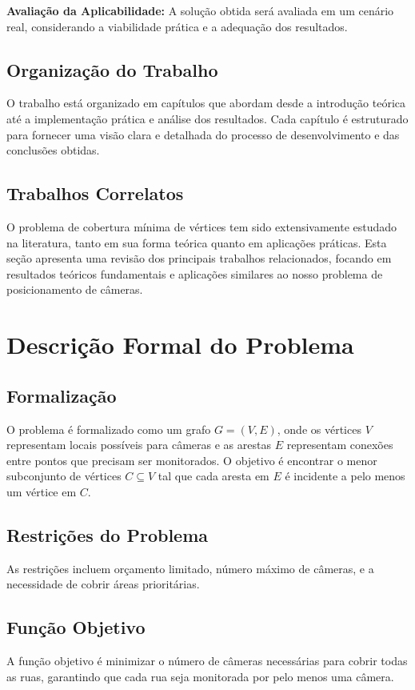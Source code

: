\documentclass[12pt, a4paper]{report}
\begin{document}
\textbf{Avaliação da Aplicabilidade:} A solução obtida será avaliada em um cenário real, considerando a viabilidade prática e a adequação dos resultados.

\section{Organização do Trabalho}
O trabalho está organizado em capítulos que abordam desde a introdução teórica até a implementação prática e análise dos resultados. Cada capítulo é estruturado para fornecer uma visão clara e detalhada do processo de desenvolvimento e das conclusões obtidas.

\section{Trabalhos Correlatos}
O problema de cobertura mínima de vértices tem sido extensivamente estudado na literatura, tanto em sua forma teórica quanto em aplicações práticas. Esta seção apresenta uma revisão dos principais trabalhos relacionados, focando em resultados teóricos fundamentais e aplicações similares ao nosso problema de posicionamento de câmeras.

\chapter{Descrição Formal do Problema}

\section{Formalização}
O problema é formalizado como um grafo \(G = (V, E)\), onde os vértices \(V\) representam locais possíveis para câmeras e as arestas \(E\) representam conexões entre pontos que precisam ser monitorados. O objetivo é encontrar o menor subconjunto de vértices \(C \subseteq V\) tal que cada aresta em \(E\) é incidente a pelo menos um vértice em \(C\).

\section{Restrições do Problema}
As restrições incluem orçamento limitado, número máximo de câmeras, e a necessidade de cobrir áreas prioritárias.

\section{Função Objetivo}
A função objetivo é minimizar o número de câmeras necessárias para cobrir todas as ruas, garantindo que cada rua seja monitorada por pelo menos uma câmera.
\end{document}
